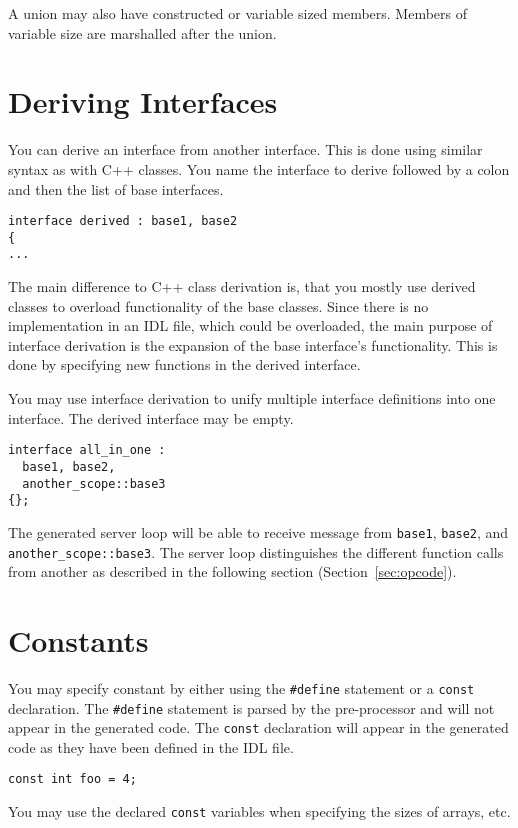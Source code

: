 A union may also have constructed or variable sized members. Members of
variable size are marshalled after the union.

\section{Deriving Interfaces}
You can derive an interface from another interface. This is done
using similar syntax as with C++ classes. You name the interface to derive
followed by a colon and then the list of base interfaces.
\begin{verbatim}
interface derived : base1, base2
{
...
\end{verbatim}

The main difference to C++ class derivation is, that you mostly use derived 
classes to overload functionality of the base classes. Since there is no
implementation in an IDL file, which could be overloaded, the main purpose
of interface derivation is the expansion of the base interface's functionality.
This is done by specifying new functions in the derived interface.

You may use interface derivation to unify multiple interface definitions
into one interface. The derived interface may be empty. 
\begin{verbatim}
interface all_in_one : 
  base1, base2, 
  another_scope::base3
{};
\end{verbatim}

The generated server loop will be able to receive message from \verb|base1|,
\verb|base2|, and \verb|another_scope::base3|. The server loop
distinguishes the different function calls from another as described
in the following section (Section~\ref{sec:opcode}).

\section{Constants}
You may specify constant by either using the \verb|#define| statement
or a {\tt const} declaration. The \verb|#define| statement is parsed
by the pre-processor and will not appear in the generated code. The
{\tt const} declaration will appear in the generated code as they have
been defined in the IDL file.

\begin{verbatim}
const int foo = 4;
\end{verbatim}

You may use the declared {\tt const} variables when specifying the sizes
of arrays, etc.

